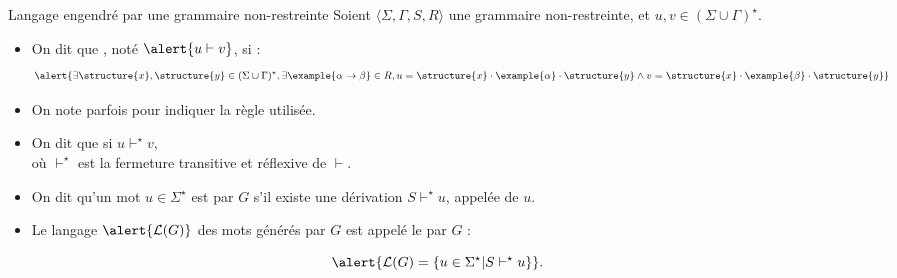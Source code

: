 
\begingroup

\begin{frame}{Langage engendré par une grammaire non-restreinte}
  Soient \alert{$\langle \Sigma, \Gamma, S, R \rangle$} une grammaire non-restreinte, et $u, v \in (\Sigma \cup \Gamma)^\star$. 
  \begin{itemize}
  \item On dit que , noté $\alert{u \vdash v}$, si :
    $$\alert{\exists \structure{x}, \structure{y} \in (\Sigma \cup \Gamma)^\star, \exists \example{\alpha \rightarrow \beta} \in R,
    u = \structure{x} \cdot \example{\alpha} \cdot \structure{y} \land v = \structure{x} \cdot \example{\beta} \cdot \structure{y}}$$

  \item On note parfois  pour indiquer la règle utilisée.

  \item On dit que  si \alert{$u \vdash^\star v$},\\
    où \alert{$\vdash^\star$ est la fermeture transitive et réflexive de $\vdash$}.

  \item On dit qu'un mot $u \in \Sigma^\star$ est  par $G$ s'il existe une dérivation $S \vdash^\star u$, appelée  de $u$. 
  \item Le langage $\alert{\mathcal{L}(G)}$ des mots générés par $G$ est appelé le  par $G$ :
  \end{itemize}
  $$\alert{\mathcal{L}(G) = \{u\in\Sigma^\star | S \vdash^\star u \}}.$$
\end{frame}
\endgroup
